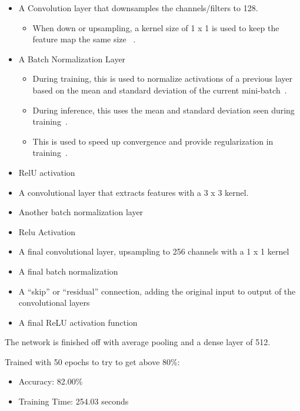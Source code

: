 \documentclass{article}
\begin{document}
    \begin{itemize}
        \item A Convolution layer that downsamples the channels/filters to 128.
        \begin{itemize}
            \item When down or upsampling, a kernel size of 1 x 1 is used to keep the feature map the same size ~\cite{mukherjee2022annotated}.
        \end{itemize}
        \item A Batch Normalization Layer
        \begin{itemize}
            \item During training, this is used to normalize activations of a previous layer based on the mean and standard deviation of the current mini-batch~\cite{mukherjee2022annotated}.
            \item During inference, this uses the mean and standard deviation seen during training~\cite{mukherjee2022annotated}.
            \item This is used to speed up convergence and provide regularization in training~\cite{mukherjee2022annotated}.
        \end{itemize}
        \item RelU activation
        \item A convolutional layer that  extracts features with a 3 x 3 kernel.
        \item Another batch normalization layer
        \item Relu Activation
        \item A final convolutional layer, upsampling to 256 channels with a 1 x 1 kernel
        \item A final batch normalization
        \item A ``skip'' or ``residual'' connection, adding the original input to output of the convolutional layers
        \item A final ReLU activation function
    \end{itemize}

    The network is finished off with average pooling and a dense layer of 512.

    Trained with 50 epochs to try to get above 80\%:

    \begin{itemize}
        \item Accuracy: 82.00\%
        \item Training Time: 254.03 seconds
    \end{itemize}
\end{document}
